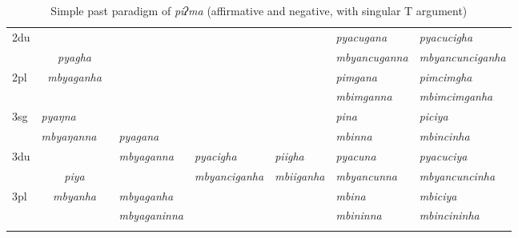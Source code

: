 \begin{landscape}
\begin{table}[p]
{\begin{tabular}{l|p{2.4cm}|p{1.5cm}|p{2.4cm}|p{2.4cm}|p{2.4cm}|p{3.2cm}|p{3.2cm}}
 \cline{1-2} \cline{7-8}			
{\sc 2du}		& 	\multicolumn{2}{c|}{}     &  \multicolumn{3}{c|}{\cellcolor[gray]{.8}} & \it  pyacugana  & \it   pyacucigha \\
		&  	\multicolumn{2}{c|}{\it  pyagha} &   \multicolumn{3}{c|}{\cellcolor[gray]{.8}}& \it mbyancuganna  & \it  mbyancunciganha \\
 \cline{1-1} \cline{7-8}			
{\sc 2pl}	& 	\multicolumn{2}{c|}{\it mbyaganha} &   \multicolumn{3}{c|}{ \cellcolor[gray]{.8}}& \it  pimgana& \it  pimcimgha  \\
		&  	\multicolumn{2}{c|}{ }&   \multicolumn{3}{c|}{\cellcolor[gray]{.8} }& \it  mbimganna & \it  mbimcimganha \\
\hline
{\sc 3sg}	& \it pyaŋna	  & \it 	      	& \it   			& \it     & \it     	& \it pina& \it piciya\\
		& \it  mbyaŋanna   & \it    	& \it  pyagana& \it   & \it    & \it mbinna& \it mbincinha\\
  \cline{1-2}  \cline{7-8}					
{\sc 3du}		&   \multicolumn{2}{c|}{}& \it mbyaganna& \it pyacigha & \it    piigha& \it   pyacuna & \it   pyacuciya\\
		&   \multicolumn{2}{c|}{\it piya}& \it   		& \it 		mbyanciganha	& \it  mbiiganha & \it  mbyancunna & \it  mbyancuncinha\\
 \cline{1-1} \cline{4-4} \cline{7-8}	
{\sc 3pl}		&\multicolumn{2}{c|}{\it mbyanha}& \it mbyaganha& \it & \it  & \it mbina& \it mbiciya\\	
	& \multicolumn{2}{c|}{ }& \it mbyaganinna& \it  & \it  & \it mbininna& \it mbincininha \\
\lspbottomrule
\end{tabular}
}
\caption{Simple past paradigm of \emph{piʔma}  (affirmative and negative, with singular T argument)}\label{par-pipma-pst}
\end{table}




\end{landscape}
